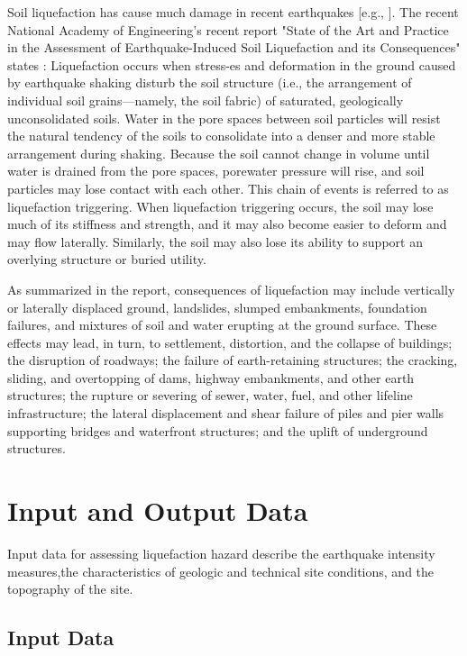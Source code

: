 Soil liquefaction has cause much damage in recent earthquakes [e.g., \cite{cubrinovski2011geotechnical,cubrinovski2017liquefaction,Bray2017}]. The recent National Academy of Engineering’s recent report "State of the Art and Practice in the Assessment of Earthquake-Induced Soil Liquefaction and its Consequences" states \citep{national2016state}: Liquefaction occurs when stress-es and deformation in the ground caused by earthquake shaking disturb the soil structure (i.e., the arrangement of individual soil grains—namely, the soil fabric) of saturated, geologically unconsolidated soils. Water in the pore spaces between soil particles will resist the natural tendency of the soils to consolidate into a denser and more stable arrangement during shaking. Because the soil cannot change in volume until water is drained from the pore spaces, porewater pressure will rise, and soil particles may lose contact with each other. This chain of events is referred to as liquefaction triggering. When liquefaction triggering occurs, the soil may lose much of its stiffness and strength, and it may also become easier to deform and may flow laterally. Similarly, the soil may also lose its ability to support an overlying structure or buried utility. 

As summarized in the \cite{national2016state} report, consequences of liquefaction may include vertically or laterally displaced ground, landslides, slumped embankments, foundation failures, and mixtures of soil and water erupting at the ground surface. These effects may lead, in turn, to settlement, distortion, and the collapse of buildings; the disruption of roadways; the failure of earth-retaining structures; the cracking, sliding, and overtopping of dams, highway embankments, and other earth structures; the rupture or severing of sewer, water, fuel, and other lifeline infrastructure; the lateral displacement and shear failure of piles and pier walls supporting bridges and waterfront structures; and the uplift of underground structures.

\section{Input and Output Data}

Input data for assessing liquefaction hazard describe the earthquake intensity measures,the characteristics of geologic and technical site conditions, and the topography of the site.

\subsection{Input Data}
\label{subsec:eq_liquefaction_input}

